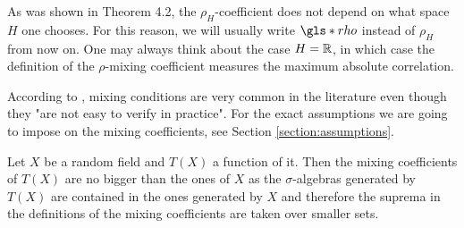 \begin{remark} \label{remark:mixing coefficients coincide}
    As was shown in \cite{[6]BRADLEY1985335} Theorem 4.2, the $\rho_H$-coefficient does not depend on what space $H$ one chooses. For this reason, we will usually write $\gls*{rho}$ instead of $\rho_H$ from now on. One may always think about the case $H = \mathbb{R}$, in which case the definition of the $\rho$-mixing coefficient measures the maximum absolute correlation.
\end{remark}

According to \cite{[0]BUCCHIA2017344}, mixing conditions are very common in the literature even though they "are not easy to verify in practice". For the exact assumptions we are going to impose on the mixing coefficients, see Section \ref{section:assumptions}.

\begin{remark} \label{rem:mixing coefficients smaller for transform}
    Let $X$ be a random field and $T(X)$ a function of it. Then the mixing coefficients of $T(X)$ are no bigger than the ones of $X$ as the $\sigma$-algebras generated by $T(X)$ are contained in the ones generated by $X$ and therefore the suprema in the definitions of the mixing coefficients are taken over smaller sets.
\end{remark}
